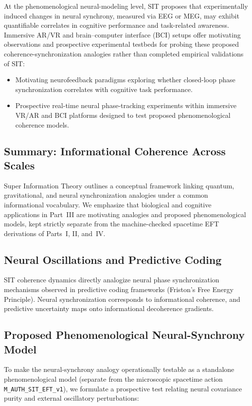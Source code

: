 At the phenomenological neural-modeling level, SIT proposes that experimentally induced changes in neural synchrony, measured via EEG or MEG, may exhibit quantifiable correlates in cognitive performance and task-related awareness. Immersive AR/VR and brain--computer interface (BCI) setups offer motivating observations and prospective experimental testbeds for probing these proposed coherence-synchronization analogies rather than completed empirical validations of SIT:
\begin{itemize}
\item Motivating neurofeedback paradigms exploring whether closed-loop phase synchronization correlates with cognitive task performance.
\item Prospective real-time neural phase-tracking experiments within immersive VR/AR and BCI platforms designed to test proposed phenomenological coherence models.
\end{itemize}

\subsection{Summary: Informational Coherence Across Scales}

Super Information Theory outlines a conceptual framework linking quantum, gravitational, and neural synchronization analogies under a common informational vocabulary. We emphasize that biological and cognitive applications in Part~III are motivating analogies and proposed phenomenological models, kept strictly separate from the machine-checked spacetime EFT derivations of Parts~I, II, and~IV.

\subsection{Neural Oscillations and Predictive Coding}

SIT coherence dynamics directly analogize neural phase synchronization mechanisms observed in predictive coding frameworks (Friston's Free Energy Principle). Neural synchronization corresponds to informational coherence, and predictive uncertainty maps onto informational decoherence gradients.

\subsection{Proposed Phenomenological Neural-Synchrony Model}
\label{sec:SITneuroPrediction}

To make the neural-synchrony analogy operationally testable as a standalone phenomenological model (separate from the microscopic spacetime action \texttt{M\_AUTH\_SIT\_EFT\_v1}), we formulate a prospective test relating neural covariance purity and external oscillatory perturbations:

